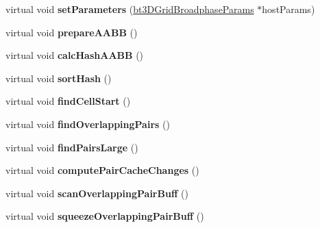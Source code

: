 \begin{DoxyCompactItemize}
\item 
\mbox{\label{classbtGpu3DGridBroadphase_ab28568e76e171d94d482fe81f860281e}} 
virtual void {\bfseries set\+Parameters} (\hyperlink{structbt3DGridBroadphaseParams}{bt3\+D\+Grid\+Broadphase\+Params} $\ast$host\+Params)
\item 
\mbox{\label{classbtGpu3DGridBroadphase_a6c083d06a439c7c4a9218c4e336e0622}} 
virtual void {\bfseries prepare\+A\+A\+BB} ()
\item 
\mbox{\label{classbtGpu3DGridBroadphase_a80159f60d018c65850a7fdacaf582930}} 
virtual void {\bfseries calc\+Hash\+A\+A\+BB} ()
\item 
\mbox{\label{classbtGpu3DGridBroadphase_a359392ed2ccfeebbc7fe619979c5f969}} 
virtual void {\bfseries sort\+Hash} ()
\item 
\mbox{\label{classbtGpu3DGridBroadphase_ae77c39ed454a00219955ff434a3e461e}} 
virtual void {\bfseries find\+Cell\+Start} ()
\item 
\mbox{\label{classbtGpu3DGridBroadphase_a3ab912cd45cf3a884bda07a530c45170}} 
virtual void {\bfseries find\+Overlapping\+Pairs} ()
\item 
\mbox{\label{classbtGpu3DGridBroadphase_a6884baa0fc33a33b90ab2e740232e6b6}} 
virtual void {\bfseries find\+Pairs\+Large} ()
\item 
\mbox{\label{classbtGpu3DGridBroadphase_a3af6e9b44de069f6eb21c835c209b0c5}} 
virtual void {\bfseries compute\+Pair\+Cache\+Changes} ()
\item 
\mbox{\label{classbtGpu3DGridBroadphase_a3fd520c5de7034e983fb04b9066139dd}} 
virtual void {\bfseries scan\+Overlapping\+Pair\+Buff} ()
\item 
\mbox{\label{classbtGpu3DGridBroadphase_a93ce349dfc6c9be130f90e49305a9bdd}} 
virtual void {\bfseries squeeze\+Overlapping\+Pair\+Buff} ()
\item 

\end{DoxyCompactItemize}
